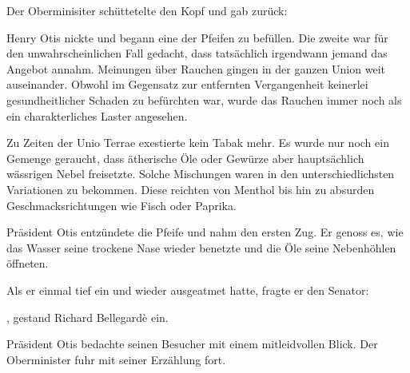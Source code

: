 \par

Der Oberminisiter schüttetelte den Kopf und gab zurück: 

\par

Henry Otis nickte und begann eine der Pfeifen zu befüllen. Die zweite war für den unwahrscheinlichen Fall gedacht, dass tatsächlich irgendwann jemand das Angebot annahm. Meinungen über Rauchen gingen in der ganzen Union weit auseinander. Obwohl im Gegensatz zur entfernten Vergangenheit keinerlei gesundheitlicher Schaden zu befürchten war, wurde das Rauchen immer noch als ein charakterliches Laster angesehen.

\par

Zu Zeiten der Unio Terrae exestierte kein Tabak mehr. Es wurde nur noch ein Gemenge geraucht, dass ätherische Öle oder Gewürze aber hauptsächlich wässrigen Nebel freisetzte. Solche Mischungen waren in den unterschiedlichsten Variationen zu bekommen. Diese reichten von Menthol bis hin zu absurden Geschmacksrichtungen wie Fisch oder Paprika.

\par

Präsident Otis entzündete die Pfeife und nahm den ersten Zug. Er genoss es, wie das Wasser seine trockene Nase wieder benetzte und die Öle seine Nebenhöhlen öffneten.

\par

Als er einmal tief ein und wieder ausgeatmet hatte, fragte er den Senator: 

\par

, gestand Richard Bellegardè ein. 

\par

Präsident Otis bedachte seinen Besucher mit einem mitleidvollen Blick. Der Oberminister fuhr mit seiner Erzählung fort. 

